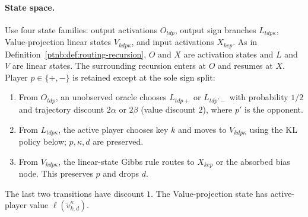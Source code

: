 \paragraph{State space.}\label{ptnb:app:attention-state-space}
Use four state families: output activations $O_{tdp}$, output sign branches $L_{tdp\kappa}$, Value-projection linear states $V_{kdp\kappa}$, and input activations $X_{kep}$. As in Definition~\ref{ptnb:def:routing-recursion}, $O$ and $X$ are activation states and $L$ and $V$ are linear states. The surrounding recursion enters at $O$ and resumes at $X$. Player $p\in\{+,-\}$ is retained except at the sole sign split:
\begin{enumerate}
    \item From $O_{tdp}$, an unobserved oracle chooses $L_{tdp+}$ or $L_{tdp'-}$ with probability $1/2$ and trajectory discount $2\alpha$ or $2\beta$ (value discount $2$), where $p'$ is the opponent.
    \item From $L_{tdp\kappa}$, the active player chooses key $k$ and moves to $V_{kdp\kappa}$ using the KL policy below; $p,\kappa,d$ are preserved.
    \item From $V_{kdp\kappa}$, the linear-state Gibbs rule routes to $X_{kep}$ or the absorbed bias node. This preserves $p$ and drops $d$.
\end{enumerate}
The last two transitions have discount $1$. The Value-projection state has active-player value $\ell(\tilde v_{k,d}^\kappa)$.

